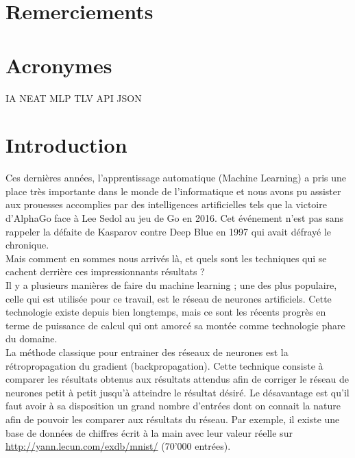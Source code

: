\documentclass{article}
\begin{document}




\section*{Remerciements}

\newpage
\section*{Acronymes}
IA
NEAT
MLP
TLV
API
JSON
\newpage
\tableofcontents

\newpage

\listoffigures

\newpage

\section{Introduction}

Ces dernières années, l'apprentissage automatique (Machine Learning) a pris une place très importante dans le monde de l'informatique et nous avons pu assister aux prouesses accomplies par des intelligences artificielles tels que la victoire d'AlphaGo face à Lee Sedol au jeu de Go en 2016\cite{wikialphagolee}. Cet événement n'est pas sans rappeler la défaite de Kasparov contre Deep Blue en 1997 qui avait défrayé le chronique\cite{kasparov}.\\
Mais comment en sommes nous arrivés là, et quels sont les techniques qui se cachent derrière ces impressionnants résultats ?\\
Il y a plusieurs manières de faire du machine learning ; une des plus populaire, celle qui est utilisée pour ce travail, est le réseau de neurones artificiels. Cette technologie existe depuis bien longtemps, mais ce sont les récents progrès en terme de puissance de calcul qui ont amorcé sa montée comme technologie phare du domaine\cite{nnpower}.\\

La méthode classique pour entrainer des réseaux de neurones est la rétropropagation du gradient (backpropagation). Cette technique consiste à comparer les résultats obtenus aux résultats attendus afin de corriger le réseau de neurones petit à petit jusqu'à atteindre le résultat désiré. Le désavantage est qu'il faut avoir à sa disposition un grand nombre d'entrées dont on connait la nature afin de pouvoir les comparer aux résultats du réseau. Par exemple, il existe une base de données de chiffres écrit à la main avec leur valeur réelle sur \url{http://yann.lecun.com/exdb/mnist/} (70'000 entrées).\\
\end{document}
